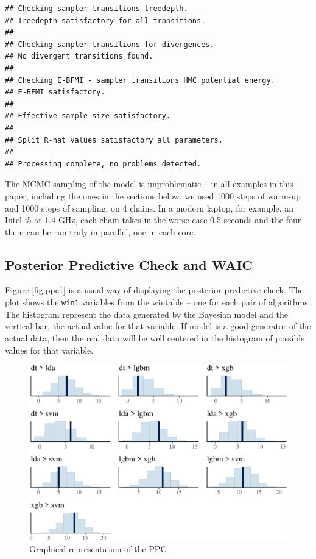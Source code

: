 \documentclass[twoside,11pt,preprint]{article}
\begin{document}
\begin{verbatim}
## Checking sampler transitions treedepth.
## Treedepth satisfactory for all transitions.
## 
## Checking sampler transitions for divergences.
## No divergent transitions found.
## 
## Checking E-BFMI - sampler transitions HMC potential energy.
## E-BFMI satisfactory.
## 
## Effective sample size satisfactory.
## 
## Split R-hat values satisfactory all parameters.
## 
## Processing complete, no problems detected.
\end{verbatim}

The MCMC sampling of the model is unproblematic -- in all examples in
this paper, including the ones in the sections below, we used 1000
steps of warm-up and 1000 steps of sampling, on 4 chains. In a modern
laptop, for example, an Intel i5 at 1.4 GHz, each chain takes in the
worse case 0.5 seconds and the four them can be run truly in parallel,
one in each core.

\hypertarget{posterior-predictive-check-and-waic}{%
\subsection{\texorpdfstring{Posterior Predictive Check and WAIC \label{sec:ppc1}}{Posterior Predictive Check and WAIC }}\label{posterior-predictive-check-and-waic}}

Figure \ref{fig:ppc1} is a usual way of displaying the posterior
predictive check. The plot shows the \texttt{win1} variables from the
wintable -- one for each pair of algorithms. The histogram represent the data generated by the Bayesian
model and the vertical bar, the actual value for that variable. If
model is a good generator of the actual data, then the real data will
be well centered in the histogram of possible values for that
variable.

\begin{figure}
\includegraphics[width=0.7\linewidth]{figure_latex/xppc1-1} \caption{\label{fig:ppc1}Graphical representation of the PPC}\label{fig:xppc1}
\end{figure}
\end{document}
